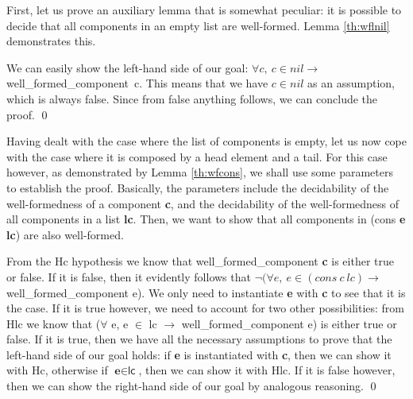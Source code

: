 			First, let us prove an auxiliary lemma that is somewhat peculiar: it is possible to decide that
	all components in an empty list are well-formed. Lemma \ref{th:wflnil} demonstrates this.			
			
		\begin{lemma} \label{th:wflnil} 
		
		
		We can easily show the left-hand side of our goal: 
		$\forall c,\ c \in nil \rightarrow$ well\_formed\_component\ c. This means that
		we have $c \in nil$ as an assumption, which is always false.				
		Since from false anything follows, we can conclude the proof. \qed
	\end{lemma}				


	\noindent Having dealt with the case where the list of \textsf{component}s is empty,
	let us now cope with  the case where it is composed by a head element and a tail.
	For this case however, as demonstrated by Lemma \ref{th:wfcons}, we shall use
	some parameters to establish the proof. Basically, the parameters include the
	decidability of the well-formedness of a \textsf{component} \textbf{c}, and the 
	decidability of the well-formedness of all \textsf{component}s in a list \textbf{lc}.
	Then, we want to show that all \textsf{component}s in (\textsf{cons} \textbf{e} \textbf{lc})
	are also well-formed. 

		\begin{lemma} \label{th:wfcons} 
				
			
			From the \textsf{Hc} hypothesis we know that well\_formed\_component \textbf{c}
			is either true or false. If it is false, then it evidently follows that $\neg (\forall e,\
			e \in (cons\ c\ lc) \rightarrow$ well\_formed\_component e). We only need to
			instantiate \textbf{e} with \textbf{c} to see that it is the case. If it is true however,
			we need to account for two other possibilities: from \textsf{Hlc} we know that ($\forall$ e, 
			e $\in$ lc $\rightarrow$ well\_formed\_component e) is either true or false.
			If it is true, then we have all the necessary assumptions to prove that
			the left-hand side of our goal holds:
			if \textbf{e} is instantiated with \textbf{c}, then we can show it with
			\textsf{Hc}, otherwise if $\textbf{e} \in \textsf{lc}$, then we can show it
			with \textsf{Hlc}. If it is false however, then we can show the right-hand side
			of our goal by analogous reasoning. \qed
	\end{lemma}	
	
